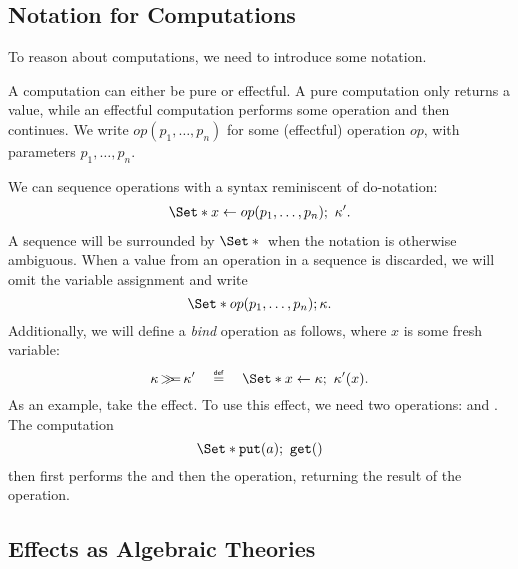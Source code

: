 \subsection{Notation for Computations}

To reason about computations, we need to introduce some notation.

A computation can either be pure or effectful. A pure computation only returns a value, while an effectful computation performs some operation and then continues. We write $op(p_1, \dots, p_n)$ for some (effectful) operation $op$, with parameters $p_1,\dots,p_n$.

We can sequence operations with a syntax reminiscent of do-notation:
\begin{align*}
    \S{x \gets op(p_1,\dots,p_n)\seq \kappa'}.
\end{align*}
A sequence will be surrounded by $\S{}$ when the notation is otherwise ambiguous. When a value from an operation in a sequence is discarded, we will omit the variable assignment and write 
\[ \S{op(p_1,\dots,p_n); \kappa}. \]
Additionally, we will define a \emph{bind} operation \bind as follows, where $x$ is some fresh variable:
\[ 
    \kappa \bind \kappa' \quad\defeq\quad \S{x \gets \kappa\seq \kappa'(x)}.
\]
As an example, take the  effect. To use this effect, we need two operations:  and . The computation
\[ \S{\oput(a)\seq \oget()} \]
then first performs the \oput and then the \oget operation, returning the result of the \oget operation.

\subsection{Effects as Algebraic Theories}

